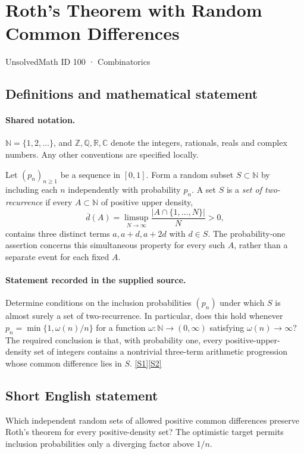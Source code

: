 \documentclass[11pt]{article}
\newcommand{\sref}[2]{\hyperlink{source:#1:#2}{[S#2]}}
\begin{document}
\setcounter{section}{99}
\section{Roth's Theorem with Random Common Differences}\label{100}
{\small\sffamily UnsolvedMath ID 100 · Combinatorics}
\subsection{Definitions and mathematical statement}

\paragraph{Shared notation.}$\mathbb N=\{1,2,\ldots\}$, and $\mathbb Z,\mathbb Q,\mathbb R,\mathbb C$ denote the integers, rationals, reals and complex numbers. Any other conventions are specified locally.


Let $(p_n)_{n\ge1}$ be a sequence in $[0,1]$. Form a random subset $S\subset\mathbb N$ by including each $n$ independently with probability $p_n$. A set $S$ is a \emph{set of two-recurrence} if every $A\subset\mathbb N$ of positive upper density,
\[
\overline d(A)=\limsup_{N\to\infty}\frac{|A\cap\{1,\ldots,N\}|}{N}>0,
\]
contains three distinct terms $a,a+d,a+2d$ with $d\in S$. The probability-one assertion concerns this simultaneous property for every such $A$, rather than a separate event for each fixed $A$.
\paragraph{Statement recorded in the supplied source.}
Determine conditions on the inclusion probabilities $(p_n)$ under which $S$ is almost surely a set of two-recurrence. In particular, does this hold whenever $p_n=\min\{1,\omega(n)/n\}$ for a function $\omega:\mathbb N\to(0,\infty)$ satisfying $\omega(n)\to\infty$? The required conclusion is that, with probability one, every positive-upper-density set of integers contains a nontrivial three-term arithmetic progression whose common difference lies in $S$. \sref{100}{1}\sref{100}{2}
\subsection{Short English statement}
Which independent random sets of allowed positive common differences preserve Roth's theorem for every positive-density set? The optimistic target permits inclusion probabilities only a diverging factor above $1/n$.
\end{document}
